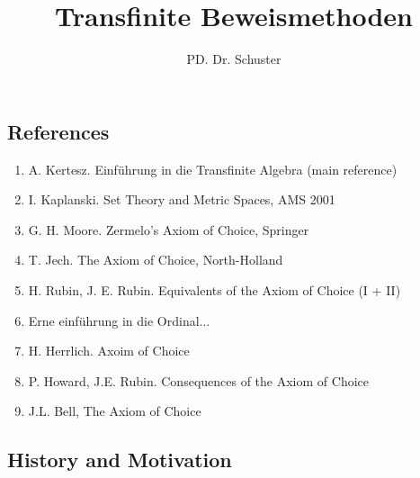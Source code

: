 \documentclass[headsepline=true,DIV=11]{scrartcl}
\theoremstyle{definition}
\newenvironment{gelaber}{}{}
\newenvironment{preamble}{}{}
\begin{document}
\begin{preamble}
\subject{Vorlesung aus dem Sommersemester 2013}
\title{Transfinite Beweismethoden}
\author{PD. Dr. Schuster}
\date{}

\maketitle
\thispagestyle{empty}
\tableofcontents
\clearpage
\end{preamble}

\setcounter{section}{0}


\subsection*{References}

\begin{gelaber}
	\begin{enumerate}
		\item A. Kertesz. Einführung in die Transfinite Algebra (main reference)
		\item I. Kaplanski. Set Theory and Metric Spaces, AMS 2001
		\item G. H. Moore. Zermelo's Axiom of Choice, Springer
		\item T. Jech. The Axiom of Choice, North-Holland
		\item H. Rubin, J. E. Rubin. Equivalents of the Axiom of Choice (I + II)
		\item Erne einführung in die Ordinal...
		\item H. Herrlich. Axoim of Choice
		\item P. Howard, J.E. Rubin. Consequences of the Axiom of Choice
		\item J.L. Bell, The Axiom of Choice
	\end{enumerate}
\end{gelaber}

\subsection*{History and Motivation}
\end{document}
